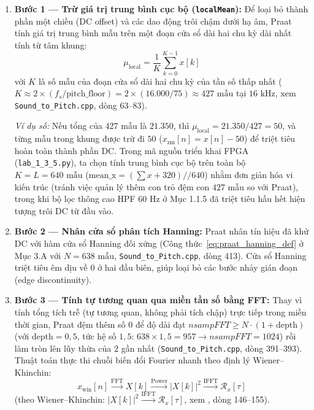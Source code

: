 \documentclass[11pt,a4paper]{article}
\begin{document}
\begin{enumerate}
    \setlength{\itemsep}{2pt}
    \item \textbf{Bước 1 --- Trừ giá trị trung bình cục bộ (\texttt{localMean}):}
    Để loại bỏ thành phần một chiều (DC offset) và các dao động trôi chậm dưới hạ âm, Praat tính giá trị trung bình mẫu trên một đoạn cửa sổ dài hai chu kỳ dài nhất tính từ tâm khung:
    \[
    \mu_{\text{local}} = \frac{1}{K} \sum_{k=0}^{K-1} x[k]
    \]
    với $K$ là số mẫu của đoạn cửa sổ dài hai chu kỳ của tần số thấp nhất ($K \approx 2 \times (f_s / \text{pitch\_floor}) = 2 \times (16.000 / 75) \approx 427\text{ mẫu}$ tại $16\text{ kHz}$, xem \texttt{Sound\_to\_Pitch.cpp}, dòng 63--83).
    
    \textit{Ví dụ số:} Nếu tổng của 427 mẫu là $21.350$, thì $\mu_{\text{local}} = 21.350 / 427 = 50$, và từng mẫu trong khung được trừ đi $50$ ($x_{\text{zm}}[n] = x[n] - 50$) để triệt tiêu hoàn toàn thành phần DC. Trong mã nguồn triển khai FPGA (\texttt{lab\_1\_3\_5.py}), ta chọn tính trung bình cục bộ trên toàn bộ $K = L = 640\text{ mẫu}$ ($\text{mean\_x} = (\sum x + 320) // 640$) nhằm đơn giản hóa vi kiến trúc (tránh việc quản lý thêm con trỏ đệm con $427$ mẫu so với Praat), trong khi bộ lọc thông cao HPF $60\text{ Hz}$ ở Mục 1.1.5 đã triệt tiêu hầu hết hiện tượng trôi DC từ đầu vào.
    \item \textbf{Bước 2 --- Nhân cửa sổ phân tích Hanning:}
    Praat nhân tín hiệu đã khử DC với hàm cửa sổ Hanning đối xứng (Công thức~\eqref{eq:praat_hanning_def} ở Mục 3.A với $N = 638\text{ mẫu}$, \texttt{Sound\_to\_Pitch.cpp}, dòng 413). Cửa sổ Hanning triệt tiêu êm dịu về $0$ ở hai đầu biên, giúp loại bỏ các bước nhảy gián đoạn (edge discontinuity).
    \item \textbf{Bước 3 --- Tính tự tương quan qua miền tần số bằng FFT:}
    Thay vì tính tổng tích trễ (tự tương quan, không phải tích chập) trực tiếp trong miền thời gian, Praat đệm thêm số $0$ để độ dài đạt $nsampFFT \ge N \cdot (1 + \text{depth})$ (với $\text{depth} = 0{,}5$, tức hệ số $1{,}5$: $638 \times 1{,}5 = 957 \to nsampFFT = 1024$) rồi làm tròn lên lũy thừa của $2$ gần nhất (\texttt{Sound\_to\_Pitch.cpp}, dòng 391--393). Thuật toán thực thi chuỗi biến đổi Fourier nhanh theo định lý Wiener--Khinchin:
    \[
    x_{\text{win}}[n] \xrightarrow{\text{FFT}} X[k] \xrightarrow{\text{Power}} |X[k]|^2 \xrightarrow{\text{IFFT}} \mathcal{R}_x[\tau]
    \]
    (theo Wiener--Khinchin: $|X[k]|^2 \xrightarrow{\text{IFFT}} \mathcal{R}_x[\tau]$, xem , dòng 146--155).


\end{enumerate}
\end{document}
